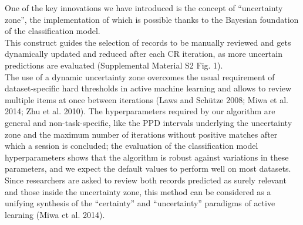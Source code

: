 \documentclass{article}
\begin{document}
One of the key innovations we have introduced is the concept of
``uncertainty zone'', the implementation of which is possible thanks to
the Bayesian foundation of the classification model.\\
This construct guides the selection of records to be manually reviewed
and gets dynamically updated and reduced after each CR iteration, as
more uncertain predictions are evaluated (Supplemental Material S2 Fig.
1).\\
The use of a dynamic uncertainty zone overcomes the usual requirement of
dataset-specific hard thresholds in active machine learning and allows
to review multiple items at once between iterations (Laws and Schütze
2008; Miwa et al. 2014; Zhu et al. 2010). The hyperparameters required
by our algorithm are general and non-task-specific, like the PPD
intervals underlying the uncertainty zone and the maximum number of
iterations without positive matches after which a session is concluded;
the evaluation of the classification model hyperparameters shows that
the algorithm is robust against variations in these parameters, and we
expect the default values to perform well on most datasets.\\
Since researchers are asked to review both records predicted as surely
relevant and those inside the uncertainty zone, this method can be
considered as a unifying synthesis of the ``certainty'' and
``uncertainty'' paradigms of active learning (Miwa et al. 2014).\\
\end{document}
